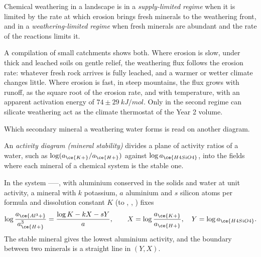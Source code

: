 \begin{definition}\label{def:b3:water-rock-interaction:regimes}
Chemical weathering in a landscape is in a \emph{supply-limited
regime} when it is limited by the rate at which
erosion brings fresh minerals to the weathering front, and in a
\emph{weathering-limited regime} when fresh
minerals are abundant and the rate of the reactions limits it.
\end{definition}

A compilation of small catchments shows both. Where erosion is slow, under
thick and leached soils on gentle relief, the weathering flux follows the
erosion rate: whatever fresh rock arrives is fully leached, and a warmer or
wetter climate changes little. Where erosion is fast, in steep mountains, the
flux grows with runoff, as the square root of the erosion rate, and with
temperature, with an apparent activation energy of $74 \pm
\qty{29}{kJ/mol}$. Only in the second regime can silicate weathering act as
the climate thermostat of the Year 2 volume.

Which secondary mineral a weathering water forms is read on another
diagram.

\begin{definition}\label{def:b3:water-rock-interaction:activity-diagram}
An \emph{activity diagram (mineral stability)}
divides a plane of activity ratios of a water, such as
$\log(a_{\ce{K+}}/a_{\ce{H+}})$ against $\log a_{\ce{H4SiO4}}$, into the
fields where each mineral of a chemical system is the stable one.
\end{definition}

\begin{proposition}\label{prop:b3:water-rock-interaction:boundaries}
In the system ------, with aluminium conserved in the solids
and water at unit activity, a mineral with $k$ potassium, $a$ aluminium and
$s$ silicon atoms per formula and dissolution constant $K$ (to ,
, ) fixes
\[
\log\frac{a_{\ce{Al^3+}}}{a_{\ce{H+}}^3} = \frac{\log K - kX - sY}{a},
\qquad X = \log\frac{a_{\ce{K+}}}{a_{\ce{H+}}},\quad Y = \log a_{\ce{H4SiO4}}.
\]
The stable mineral gives the lowest aluminium activity, and the boundary
between two minerals is a straight line in $(Y, X)$.
\end{proposition}

